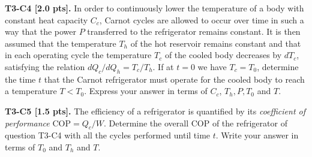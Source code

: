 \textbf{T3-C4 [2.0 pts].} In order to continuously lower the temperature of a
body with constant heat capacity $C_c$, Carnot cycles are allowed to occur over
time in such a way that the power $P$ transferred to the refrigerator remains
constant. It is then assumed that the temperature $T_h$ of the hot reservoir
remains constant and that in each operating cycle the temperature $T_c$ of the
cooled body decreases by $dT_c$, satisfying the relation $dQ_c/dQ_h = T_c/T_h$.
If at $t = 0$ we have $T_c = T_0$, determine the time $t$ that the Carnot
refrigerator must operate for the cooled body to reach a temperature
$T < T_0$. Express your answer in terms of $C_c$, $T_h, P, T_0$ and $T$.

\textbf{T3-C5 [1.5 pts].} The efficiency of a refrigerator is quantified by its
\textit{coefficient of performance} $\mathrm{COP} = Q_c/W$. Determine the
overall COP of the refrigerator of question T3-C4 with all the cycles performed
until time $t$. Write your answer in terms of $T_0$ and $T_h$ and $T$.

